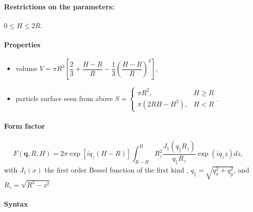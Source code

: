 \paragraph{Restrictions on the parameters:} $0 \leq H\leq 2R$.

\paragraph{Properties}
\begin{itemize}
\item volume $V=\pi R^3 \left[\dfrac{2}{3} + \dfrac{H-R}{R} - \dfrac{1}{3}\left(\dfrac{H-R}{R}\right)^3\right]$,
\item particle surface seen from above $S = \left\{\begin{array}{ll} \pi R^2, & H \geq R \\
         \pi\left(2RH-H^2\right), & H < R \end{array}\right. $.
\end{itemize}

\paragraph{Form factor}
\begin{equation*}  
F(\mathbf{q},R, H)= 2\pi \exp[i q_z (H-R)]\int_{R-H} ^{R} R_z^2 \frac{J_1(q_{\parallel} R_z) }{q_{\parallel} R_z} \exp(i q_z z) dz,
\end{equation*}
with $J_1(x)$ the first order
Bessel function of the first kind \cite{AbSt64}, $q_{\parallel} =
\sqrt{q_x^2+q_y^2}$, and $R_z = \sqrt{R^2-z^2}$

\paragraph{Syntax}\strut\\

